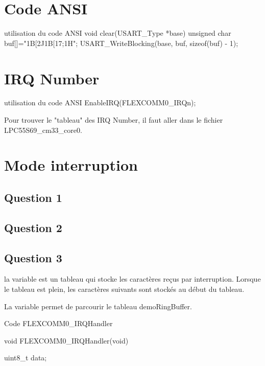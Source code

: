 {\section{Code ANSI}



\begin{Cpp}{utilisation du code ANSI} 
void clear(USART_Type *base)
{
	unsigned char buf[]="\x1B[2J\x1B[17;1H";
	USART_WriteBlocking(base, buf, sizeof(buf) - 1);
}
\end{Cpp}

\section{IRQ Number}

\begin{Cpp}{utilisation du code ANSI} 
EnableIRQ(FLEXCOMM0_IRQn);
\end{Cpp}

Pour trouver le "tableau" des IRQ Number, il faut aller dans le fichier LPC55S69\_cm33\_core0.


\section{Mode interruption}

\subsection{Question 1}

\subsection{Question 2}


\subsection{Question 3}



la variable  est un tableau qui stocke les caractères reçus par interruption.
Lorsque le tableau est plein, les caractères suivants sont stockés au début du tableau.

La variable  permet de parcourir le tableau demoRingBuffer. 

\begin{Cpp}{Code FLEXCOMM0\_IRQHandler}

void FLEXCOMM0_IRQHandler(void) {
    uint8_t data;

}
\end{Cpp}}
